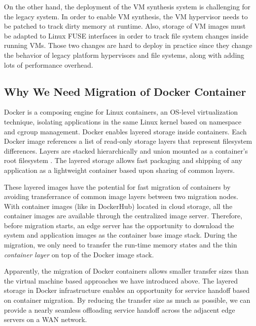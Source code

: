 On the other hand, the deployment of the VM synthesis system is challenging for the legacy system. In order to enable VM synthesis, the VM hypervisor needs to be patched to track dirty memory at runtime. Also, storage of VM images must be adapted to Linux FUSE interfaces in order to track file system changes inside running VMs. Those two changes are hard to deploy in practice since they change the behavior of legacy platform hypervisors and file systems, along with adding lots of performance overhead. 

\subsection{Why We Need Migration of Docker Container}
Docker 
is a composing engine for Linux containers, an OS-level virtualization technique, isolating applications in the same Linux kernel based on namespace and cgroup management. Docker enables layered storage inside containers.  Each Docker image references a list of read-only storage layers that represent filesystem differences. Layers are stacked hierarchically and union mounted as a container's root filesystem \cite{dockerlayer}. The layered storage allows fast packaging and shipping of any application as a lightweight container based upon sharing of common layers.

These layered images have the potential for fast migration of containers by avoiding transferrance of common image layers between two migration nodes. With container images (like in DockerHub) located in cloud storage, all the container images are available through the centralized image server. Therefore, before migration starts, an edge server has the opportunity to download the system and application images as the container base image stack. 
During the migration, we only need to transfer the run-time memory states and the thin \textit{container layer} on top of the Docker image stack. 

Apparently, the migration of Docker containers allows smaller transfer sizes than the virtual machine based approaches we have introduced above. The layered storage in Docker infrastructure enables an opportunity for service handoff based on container migration. By reducing the transfer size as much as possible, we can provide a nearly seamless offloading service handoff across the adjacent edge servers on a WAN network.

